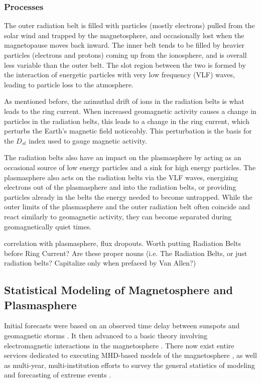 \subsubsection{Processes}
The outer radiation belt is filled with particles (mostly electrons) pulled from the solar wind and trapped by the magnetosphere, and occasionally lost when the magnetopause moves back inward. The inner belt tends to be filled by heavier particles (electrons and protons) coming up from the ionosphere, and is overall less variable than the outer belt\cite{LinksBetweenPlasmapauseRadiationBelt}. The slot region between the two is formed by the interaction of energetic particles with very low frequency (VLF) waves, leading to particle loss to the atmosphere\cite{LongTermVariationsSlotRegion}.

As mentioned before, the azimuthal drift of ions in the radiation belts is what leads to the ring current. When increased geomagnetic activity causes a change in particles in the radiation belts, this leads to a change in the ring current, which perturbs the Earth's magnetic field noticeably. This perturbation is the basis for the $D_{st}$ index used to gauge magnetic activity. 

The radiation belts also have an impact on the plasmasphere by acting as an occasional source of low energy particles and a sink for high energy particles. The plasmasphere also acts on the radiation belts via the VLF waves, energizing electrons out of the plasmasphere and into the radiation belts, or providing particles already in the belts the energy needed to become untrapped\cite{LinksBetweenPlasmapauseRadiationBelt}. While the outer limits of the plasmasphere and the outer radiation belt often coincide and react similarly to geomagnetic activity, they can become separated during geomagnetically quiet times.

\note correlation with plasmasphere, flux dropouts. Worth putting Radiation Belts before Ring Current? Are these proper nouns (i.e. The Radiation Belts, or just radiation belts? Capitalize only when prefaced by Van Allen?)

\subsection{Statistical Modeling of Magnetosphere and Plasmasphere}

Initial forecasts were based on an observed time delay between sunspots and geomagnetic storms \cite{SunspotStorms}. It then advanced to a basic theory involving electromagnetic interactions in the magnetosphere \cite{Chapman}. There now exist entire services dedicated to executing MHD-based models of the magnetosphere \cite{CCMC}, as well as multi-year, multi-institution efforts to survey the general statistics of modeling and forecasting of extreme events \cite{ExtremeEvents}.

